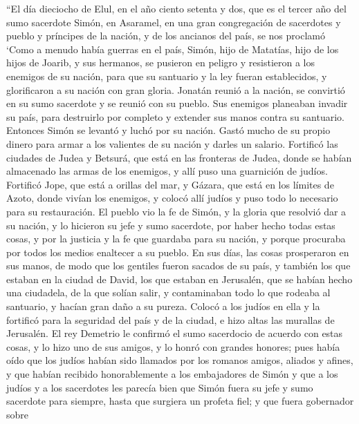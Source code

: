 ``El día dieciocho de Elul, en el año ciento setenta y dos, que es el
tercer año del sumo sacerdote Simón,  en Asaramel, en una
gran congregación de sacerdotes y pueblo y príncipes de la nación, y de
los ancianos del país, se nos proclamó  `Como a menudo
había guerras en el país, Simón, hijo de Matatías, hijo de los hijos de
Joarib, y sus hermanos, se pusieron en peligro y resistieron a los
enemigos de su nación, para que su santuario y la ley fueran
establecidos, y glorificaron a su nación con gran gloria.
 Jonatán reunió a la nación, se convirtió en su sumo
sacerdote y se reunió con su pueblo.  Sus enemigos
planeaban invadir su país, para destruirlo por completo y extender sus
manos contra su santuario.  Entonces Simón se levantó y
luchó por su nación. Gastó mucho de su propio dinero para armar a los
valientes de su nación y darles un salario.  Fortificó
las ciudades de Judea y Betsurá, que está en las fronteras de Judea,
donde se habían almacenado las armas de los enemigos, y allí puso una
guarnición de judíos.  Fortificó Jope, que está a orillas
del mar, y Gázara, que está en los límites de Azoto, donde vivían los
enemigos, y colocó allí judíos y puso todo lo necesario para su
restauración.  El pueblo vio la fe de Simón, y la gloria
que resolvió dar a su nación, y lo hicieron su jefe y sumo sacerdote,
por haber hecho todas estas cosas, y por la justicia y la fe que
guardaba para su nación, y porque procuraba por todos los medios
enaltecer a su pueblo.  En sus días, las cosas
prosperaron en sus manos, de modo que los gentiles fueron sacados de su
país, y también los que estaban en la ciudad de David, los que estaban
en Jerusalén, que se habían hecho una ciudadela, de la que solían salir,
y contaminaban todo lo que rodeaba al santuario, y hacían gran daño a su
pureza.  Colocó a los judíos en ella y la fortificó para
la seguridad del país y de la ciudad, e hizo altas las murallas de
Jerusalén.  El rey Demetrio le confirmó el sumo
sacerdocio de acuerdo con estas cosas,  y lo hizo uno de
sus amigos, y lo honró con grandes honores;  pues había
oído que los judíos habían sido llamados por los romanos amigos, aliados
y afines, y que habían recibido honorablemente a los embajadores de
Simón  y que a los judíos y a los sacerdotes les parecía
bien que Simón fuera su jefe y sumo sacerdote para siempre, hasta que
surgiera un profeta fiel;  y que fuera gobernador sobre
